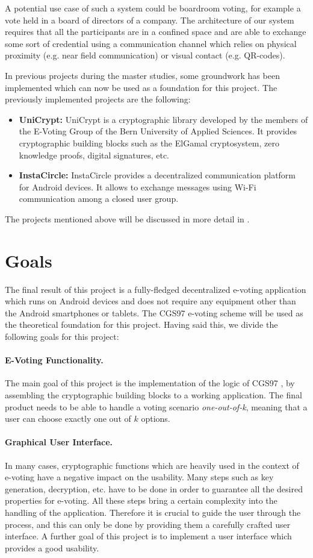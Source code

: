 \documentclass[numbers=noenddot, abstract=on, a4paper, headsepline,
footsepline, oneside, openright, draft=off, listof=leveldown]{scrreprt}
\begin{document}
A potential use case of such a system could be boardroom voting, for example a
vote held in a board of directors of a company. The architecture of our system
requires that all the participants are in a confined space and are able to
exchange some sort of credential using a communication channel which relies on
physical proximity (e.g. near field communication) or visual contact (e.g.
QR-codes).

In previous projects during the master studies, some groundwork has been
implemented which can now be used as a foundation for this project. The
previously implemented projects are the following:
\begin{itemize}
  \item \textbf{UniCrypt:} UniCrypt is a cryptographic library developed by the
  members of the E-Voting Group of the Bern University of Applied Sciences. It
  provides cryptographic building blocks such as the ElGamal cryptosystem, zero
  knowledge proofs, digital signatures, etc. 
  \item \textbf{InstaCircle: } InstaCircle provides a decentralized
  communication platform for Android devices. It allows to exchange messages
  using Wi-Fi communication among a closed user group.
\end{itemize}
The projects mentioned above will be discussed in more detail in .

\section{Goals}
\label{cha:goals}
The final result of this project is a fully-fledged decentralized e-voting
application which runs on Android devices and does not require any equipment
other than the Android smartphones or tablets. The CGS97 e-voting
scheme \cite{CGS97} will be used as the theoretical foundation for this project.
Having said this, we divide the following goals for this project:
\paragraph{E-Voting Functionality.}
The main goal of this project is the implementation of the logic of CGS97
\cite{CGS97}, by assembling the cryptographic building blocks to a working
application. The final product needs to be able to handle a
voting scenario \emph{one-out-of-k}, meaning that a user can choose exactly one
out of $k$ options. 

\paragraph{Graphical User Interface.}
In many cases, cryptographic functions which are heavily used in the context of
e-voting have a negative impact on the usability. Many steps such as key
generation, decryption, etc. have to be done in order to guarantee all the
desired properties for e-voting. All these steps bring a certain complexity
into the handling of the application. Therefore it is crucial to guide the user
through the process, and this can only be done by providing them a carefully
crafted user interface. A further goal of this project is to implement a user
interface which provides a good usability.
\end{document}
